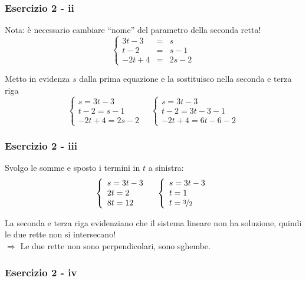 \documentclass{beamer}
\newcommand{\fig}{./figures} %
\begin{document}
\begin{frame}
\frametitle{Esercizio 2 - ii}
Nota: \`e necessario cambiare ``nome'' del parametro della seconda retta!
$$
\left\{
\begin{array}{rcl}
    3t-3 &=& s\\
    t-2 &=& s-1\\
    -2t+4&=&2s -2
\end{array}
\right.
$$

Metto in evidenza $s$ dalla prima equazione e la sostituisco nella seconda e terza riga
$$
\left\{
\begin{array}{l}
    s = 3t-3\\
    t-2 = s-1\\
    -2t+4=2s -2
\end{array}
\right.
\quad
\left\{
\begin{array}{l}
    s = 3t-3\\
    t-2 = 3t - 3 -1\\
    -2t+4=6t - 6 -2
\end{array}
\right.
$$
\end{frame}

\begin{frame}
\frametitle{Esercizio 2 - iii}
Svolgo le somme e sposto i termini in $t$ a sinistra:
$$
\left\{
\begin{array}{l}
    s=3t-3\\
    2t=2\\
    8t=12
\end{array}
\right.
\quad
\left\{
\begin{array}{l}
    s=3t-3\\
    t=1\\
    t=\nicefrac{3}{2}
\end{array}
\right.
$$

    \vspace{0.75cm}
La seconda e terza riga evidenziano che il sistema lineare non ha soluzione, quindi
le due rette non si intersecano! \\
    $\Rightarrow$ Le due rette non sono perpendicolari, sono sghembe.
\end{frame}

\begin{frame}
\frametitle{Esercizio 2 - iv}

    \vspace{-1cm}
\begin{center}
\end{center}

\end{frame}
\end{document}
